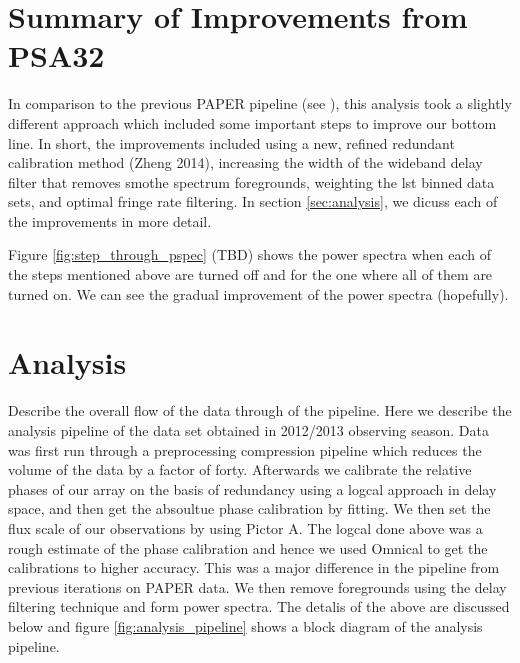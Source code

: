 \documentclass[twocolumn,numberedappendix]{emulateapj}
\begin{document}
\section{Summary of Improvements from PSA32}
In comparison to the previous PAPER pipeline (see \cite{parsons_et_al2014}),
this analysis took a slightly different approach which included some important
steps to improve our bottom line. In short, the improvements included using a
new, refined redundant calibration method (Zheng 2014), increasing the width of
the wideband delay filter that removes smothe spectrum foregrounds, weighting
the lst binned data sets, and optimal fringe rate filtering. In section
\ref{sec:analysis}, we dicuss each of the improvements in more detail.

Figure \ref{fig:step_through_pspec} (TBD) shows the power spectra when each of
the steps mentioned above are turned off and for the one where all of them are
turned on. We can see the gradual improvement of the power spectra (hopefully).




\section{Analysis}
Describe the overall flow of the data through of the pipeline.
Here we describe the analysis pipeline of the data set obtained in 2012/2013
observing season. 
Data was first run through a preprocessing compression pipeline which reduces
the volume of the data by a factor of forty. Afterwards we calibrate the
relative phases of our array on the basis of redundancy using a logcal approach
in delay space, and then get the absoultue phase calibration by fitting. We then
set the flux scale of our observations by using Pictor A. The logcal done above
was a rough estimate of the phase calibration and hence we used Omnical to get
the calibrations to higher accuracy. This was a major difference in the pipeline
from previous iterations on PAPER data. We then remove foregrounds using the
delay filtering technique and form power spectra. The detalis of the above are
discussed below and figure \ref{fig:analysis_pipeline} shows a block diagram of
the analysis pipeline.
\end{document}
